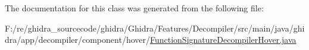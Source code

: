 The documentation for this class was generated from the following file\+:\begin{DoxyCompactItemize}
\item 
F\+:/re/ghidra\+\_\+sourcecode/ghidra/\+Ghidra/\+Features/\+Decompiler/src/main/java/ghidra/app/decompiler/component/hover/\mbox{\hyperlink{_function_signature_decompiler_hover_8java}{Function\+Signature\+Decompiler\+Hover.\+java}}\end{DoxyCompactItemize}
